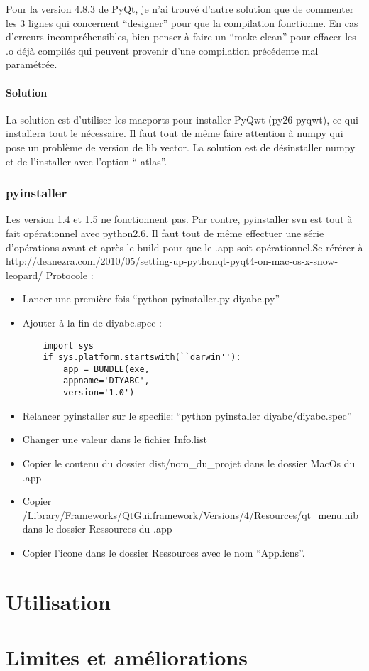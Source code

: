 \documentclass[12pt,a4paper]{article}
\begin{document}
        Pour la version 4.8.3 de PyQt, je n'ai trouvé d'autre solution que de commenter les 3 lignes qui concernent
        ``designer'' pour que la compilation fonctionne. En cas d'erreurs incompréhensibles, bien penser à faire un ``make clean''
        pour effacer les .o déjà compilés qui peuvent provenir d'une compilation précédente mal paramétrée.

        \paragraph{Solution}

        La solution est d'utiliser les macports pour installer PyQwt (py26-pyqwt), ce qui installera tout le n\'ecessaire. Il faut tout de même
        faire attention à numpy qui pose un problème de version de lib vector. La solution est de d\'esinstaller numpy et de l'installer avec l'option
        ``-atlas''. 
        
        \subsubsection{pyinstaller}

        Les version 1.4 et 1.5 ne fonctionnent pas. Par contre,
        pyinstaller svn est tout à fait op\'erationnel avec python2.6. Il faut tout de même effectuer une s\'erie d'op\'erations avant et après
        le build pour que le .app soit op\'erationnel.Se r\'er\'erer à \newline
        http://deanezra.com/2010/05/setting-up-pythonqt-pyqt4-on-mac-os-x-snow-leopard/\newline
        Protocole : 
        \begin{itemize}
            \item Lancer une première fois ``python pyinstaller.py diyabc.py''
            \item Ajouter à la fin de diyabc.spec :
        \begin{verbatim}
    import sys 
    if sys.platform.startswith(``darwin''): 
        app = BUNDLE(exe, 
        appname='DIYABC', 
        version='1.0')
        \end{verbatim}
            \item Relancer pyinstaller sur le specfile: ``python pyinstaller diyabc/diyabc.spec''
            \item Changer une valeur dans le fichier Info.list
            \item Copier le contenu du dossier dist/nom\_du\_projet dans le dossier MacOs du .app
            \item Copier /Library/Frameworks/QtGui.framework/Versions/4/Resources/qt\_menu.nib dans le dossier Ressources du .app
            \item Copier l'icone dans le dossier Ressources avec le nom ``App.icns''.
        \end{itemize}

\section{Utilisation}

\section{Limites et améliorations}
\end{document}
